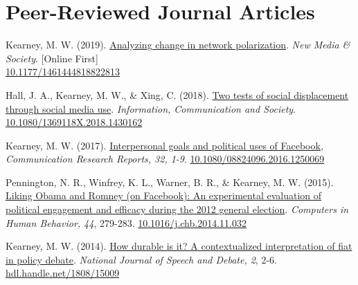 \section{Peer-Reviewed Journal Articles}
\begin{bibenum}

\item Kearney, M. W. (2019).
	\href{http://journals.sagepub.com/doi/full}{Analyzing change in network polarization}.
	\textit{New Media \& Society}. [Online First]\\
	\href{https://doi.org/10.1177/1461444818822813}{10.1177/1461444818822813}

\item Hall, J. A., Kearney, M. W., \& Xing, C. (2018).
	\href{https://www.tandfonline.com/doi/abs/10.1080/1369118X.2018.1430162}{Two tests of social displacement through social media use}.
	\textit{Information, Communication and Society}.
	\href{https://doi.org/10.1080/1369118X.2018.1430162}{10.1080/1369118X.2018.1430162}

\item Kearney, M. W. (2017).
	\href{http://www.tandfonline.com/doi/abs/10.1080/08824096.2016.1250069}{Interpersonal goals and political uses of Facebook},
	\textit{Communication Research Reports, 32, 1-9}.
	\href{https://doi.org/10.1080/08824096.2016.1250069}{10.1080/08824096.2016.1250069}

\item Pennington, N. R., Winfrey, K. L., Warner, B. R., \& Kearney, M. W. (2015).
	\href{https://www.sciencedirect.com/science/article/pii/S0747563214006347}{Liking Obama and Romney (on Facebook): An experimental evaluation of political engagement and efficacy during the 2012 general election}.
	\textit{Computers in Human Behavior, 44}, 279-283.
	\href{https://doi.org/10.1016/j.chb.2014.11.032}{10.1016/j.chb.2014.11.032}

\item Kearney, M. W. (2014). \href{http://ssrn.com/abstract=2618298}{
	How durable is it? A contextualized interpretation of fiat in policy debate}.
	\textit{National Journal of Speech and Debate, 2}, 2-6.
	\href{http://hdl.handle.net/1808/15009}{hdl.handle.net/1808/15009}

\end{bibenum}



